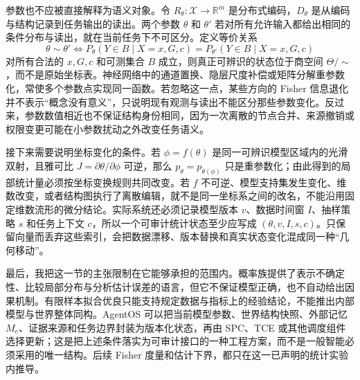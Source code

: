 参数也不应被直接解释为语义对象。令 $R_\theta:\mathcal X\to\mathbb R^m$ 是分布式编码，$D_\theta$ 是从编码与结构记录到任务输出的读出。两个参数 $\theta$ 和 $\theta'$ 若对所有允许输入都给出相同的条件分布与读出，就在当前任务下不可区分。定义等价关系
\begin{equation}
    \theta\sim\theta'
    \Longleftrightarrow
    P_\theta(Y\in B\mid X=x,G,c)
    =P_{\theta'}(Y\in B\mid X=x,G,c)
\end{equation}
对所有合法的 $x,G,c$ 和可测集合 $B$ 成立，则真正可辨识的状态位于商空间 $\Theta/{\sim}$，而不是原始坐标表。神经网络中的通道置换、隐层尺度补偿或矩阵分解重参数化，常使多个参数点实现同一函数。若忽略这一点，某些方向的 Fisher 信息退化并不表示“概念没有意义”，只说明现有观测与读出不能区分那些参数变化。反过来，参数数值相近也不保证结构身份相同，因为一次离散的节点合并、来源撤销或权限变更可能在小参数扰动之外改变任务语义。

接下来需要说明坐标变化的条件。若 $\phi=f(\theta)$ 是同一可辨识模型区域内的光滑双射，且雅可比 $J=\partial\theta/\partial\phi$ 可逆，那么 $p_\theta=p_{\theta(\phi)}$ 只是重参数化；由此得到的局部统计量必须按坐标变换规则共同改变。若 $f$ 不可逆、模型支持集发生变化、维数改变，或者结构图执行了离散编辑，就不是同一坐标系之间的改名，不能沿用固定维数流形的微分结论。实际系统还必须记录模型版本 $v$、数据时间窗 $I$、抽样策略 $s$ 和任务上下文 $c$，所以一个可审计统计状态至少应写成 $(\theta,v,I,s,c)$。只保留向量而丢弃这些索引，会把数据漂移、版本替换和真实状态变化混成同一种“几何移动”。

最后，我把这一节的主张限制在它能够承担的范围内。概率族提供了表示不确定性、比较局部分布与分析估计误差的语言，但它不保证模型正确，也不自动给出因果机制。有限样本拟合优良只能支持规定数据与指标上的经验结论，不能推出内部模型与世界整体同构。AgentOS 可以把当前模型参数、世界结构快照、外部记忆 $M_e$、证据来源和任务边界封装为版本化状态，再由 SPC、TCE 或其他调度组件选择更新；这是把上述条件落实为可审计接口的一种工程方案，而不是一般智能必须采用的唯一结构。后续 Fisher 度量和估计下界，都只在这一已声明的统计实验内推导。
